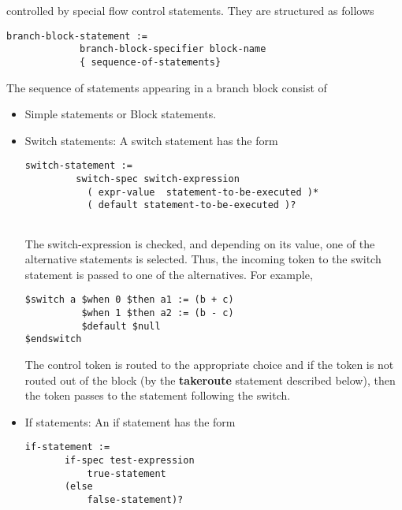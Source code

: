 \documentclass{article}
\begin{document}
\begin{itemize}
controlled by special flow control statements.
They are structured 
as follows
\begin{verbatim}
branch-block-statement :=
             branch-block-specifier block-name
             { sequence-of-statements}
\end{verbatim}
The sequence of statements appearing in a branch block
consist of
\begin{itemize}
\item Simple statements or Block statements.
\item Switch statements: A switch statement has
the form
\begin{verbatim}
switch-statement :=
         switch-spec switch-expression
           ( expr-value  statement-to-be-executed )*
           ( default statement-to-be-executed )?
            
\end{verbatim}
The switch-expression is checked, and depending on its
value, one of the alternative statements is selected.
Thus, the incoming token to the switch statement is 
passed to one of the alternatives.  For example,
\begin{verbatim}
$switch a $when 0 $then a1 := (b + c)
          $when 1 $then a2 := (b - c)
          $default $null
$endswitch
\end{verbatim}
The control token is routed to the appropriate
choice and if the token is not routed out 
of the block (by the {\bf takeroute} statement 
described below), then the token passes to the
statement following the switch. 
\item If statements: An if statement has the form
\begin{verbatim}
if-statement :=
       if-spec test-expression 
           true-statement
       (else
           false-statement)?
       

\end{verbatim}
\end{itemize}
\end{itemize}
\end{document}
